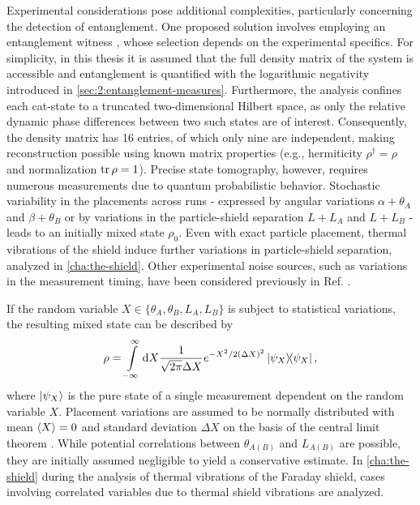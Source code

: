 Experimental considerations pose additional complexities, particularly concerning the detection of entanglement. 
One proposed solution involves employing an entanglement witness \cite{Bose_2017, Chevalier_2020}, whose selection depends on the experimental specifics. 
For simplicity, in this thesis it is assumed that the full density matrix of the system is accessible and entanglement is quantified with the logarithmic negativity introduced in \cref{sec:2:entanglement-measures}.
Furthermore, the analysis confines each cat-state to a truncated two-dimensional Hilbert space, as only the relative dynamic phase differences between two such states are of interest.
Consequently, the density matrix has 16 entries, of which only nine are independent, making reconstruction possible using known matrix properties (e.g., hermiticity $\rho^\dagger = \rho$ and normalization $\tr \rho = 1$).
Precise state tomography, however, requires numerous measurements due to quantum probabilistic behavior.
Stochastic variability in the placements across runs - expressed by angular variations $\alpha + \theta_A$ and $\beta + \theta_B$ or by variations in the particle-shield separation $L + L_A$ and $L + L_B$ - leads to an initially mixed state $\rho_0$.
Even with exact particle placement, thermal vibrations of the shield induce further variations in particle-shield separation, analyzed in \cref{cha:the-shield}.
Other experimental noise sources, such as variations in the measurement timing, have been considered previously in Ref. \cite{Nguyen_2020}.

If the random variable $X \in \{\theta_{A}, \theta_{B}, L_{A}, L_{B}\}$ is subject to statistical variations, the resulting mixed state can be described by
\begin{equation}
  \rho = \int\limits_{-\infty}^{\infty} \dd X \frac{1}{\sqrt{2\pi}\Delta X} e^{-X^2/2(\Delta X)^2} \ketbra{\psi_X} ,
\end{equation}
where $\ket{\psi_X}$ is the pure state of a single measurement dependent on the random variable $X$.
Placement variations are assumed to be normally distributed with mean $\left\langle X\right\rangle = 0$ and standard deviation $\Delta X$ on the basis of the central limit theorem \cite[p. 1195]{Riley_2018}.
While potential correlations between $\theta_{A(B)}$ and $L_{A(B)}$ are possible, they are initially assumed negligible to yield a conservative estimate.
In \cref{cha:the-shield} during the analysis of thermal vibrations of the Faraday shield, cases involving correlated variables due to thermal shield vibrations are analyzed.



